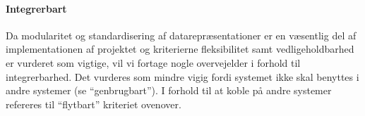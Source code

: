 \paragraph{Integrerbart} Da modularitet og standardisering af datarepræsentationer er en væsentlig del af implementationen af projektet og kriterierne fleksibilitet samt vedligeholdbarhed er vurderet som vigtige, vil vi fortage nogle overvejelder i forhold til integrerbarhed. Det vurderes som mindre vigig fordi systemet ikke skal benyttes i andre systemer (se ``genbrugbart''). I forhold til at koble på andre systemer refereres til ``flytbart'' kriteriet ovenover.
